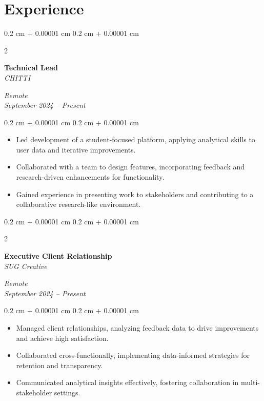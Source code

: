 \documentclass[10pt, letterpaper]{article}
\newenvironment{highlights}{
    \begin{itemize}[
        topsep=0.10 cm,
        parsep=0.10 cm,
        partopsep=0pt,
        itemsep=0pt,
        leftmargin=0.4 cm + 10pt
    ]
}{
    \end{itemize}
} %
\newenvironment{onecolentry}{
    \begin{adjustwidth}{
        0.2 cm + 0.00001 cm
    }{
        0.2 cm + 0.00001 cm
    }
}{
    \end{adjustwidth}
} %
\newenvironment{twocolentry}[2][]{
    \onecolentry
    \def\secondColumn{#2}
    \setcolumnwidth{\fill, 4.5 cm}
    \begin{paracol}{2}
}{
    \switchcolumn \raggedleft \secondColumn
    \end{paracol}
    \endonecolentry
} %
\begin{document}
    \section{Experience}
    \begin{twocolentry}{
        \textit{Remote} \\
        \textit{September 2024 – Present}
    }
        \textbf{Technical Lead} \\
        \textit{CHITTI}
    \end{twocolentry}
    \vspace{0.10 cm}
    \begin{onecolentry}
        \begin{highlights}
            \item Led development of a student-focused platform, applying analytical skills to user data and iterative improvements.
            \item Collaborated with a team to design features, incorporating feedback and research-driven enhancements for functionality.
            \item Gained experience in presenting work to stakeholders and contributing to a collaborative research-like environment.
        \end{highlights}
    \end{onecolentry}
    \vspace{0.2 cm}
    \begin{twocolentry}{
        \textit{Remote} \\
        \textit{September 2024 – Present}
    }
        \textbf{Executive Client Relationship} \\
        \textit{SUG Creative}
    \end{twocolentry}
    \vspace{0.10 cm}
    \begin{onecolentry}
        \begin{highlights}
            \item Managed client relationships, analyzing feedback data to drive improvements and achieve high satisfaction.
            \item Collaborated cross-functionally, implementing data-informed strategies for retention and transparency.
            \item Communicated analytical insights effectively, fostering collaboration in multi-stakeholder settings.
        \end{highlights}
    \end{onecolentry}
    \vspace{0.2 cm}
\end{document}
